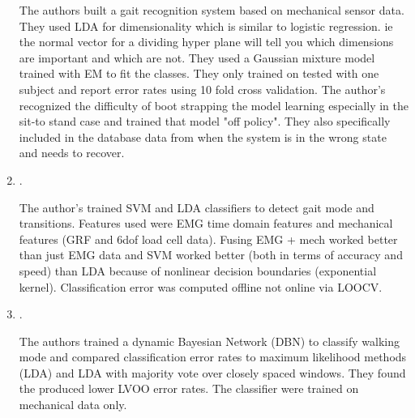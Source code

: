 \begin{enumerate}

    The authors built a gait recognition system based on mechanical sensor data.
    They used LDA for dimensionality which is similar to logistic regression. ie
    the normal vector for a dividing hyper plane will tell you which dimensions
    are important and which are not. They used a Gaussian mixture model trained
    with EM to fit the classes. They only trained on tested with one subject and
    report error rates using 10 fold cross validation. The author's recognized
    the difficulty of boot strapping the model learning especially in the sit-to
    stand case and trained that model "off policy". They also specifically
    included in the database data from when the system is in the wrong state and
    needs to recover.


    \item {}. 



    The author's trained SVM and LDA classifiers to detect gait mode and
    transitions. Features used were EMG time domain features and mechanical
    features (GRF and 6dof load cell data). Fusing EMG + mech worked better than
    just EMG data and SVM worked better (both in terms of accuracy and speed)
    than LDA because of nonlinear decision boundaries (exponential kernel).
    Classification error was computed offline not online via LOOCV.

    \item {}. 



    The authors trained a dynamic Bayesian Network (DBN) to classify walking
    mode and compared classification error rates to maximum likelihood methods
    (LDA) and LDA with majority vote over closely spaced windows. They found the
    produced lower LVOO error rates. The classifier were trained on mechanical
    data only.


\end{enumerate}
